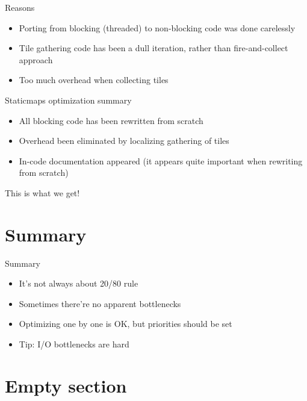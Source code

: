 \documentclass[16pt]{beamer}
\begin{document}
\begin{frame}{Reasons}
  \begin{itemize}
  \item Porting from blocking (threaded) to non-blocking code was done carelessly
  \item Tile gathering code has been a dull iteration, rather than fire-and-collect approach
  \item Too much overhead when collecting tiles
  \end{itemize}
\end{frame}

\begin{frame}{Staticmaps optimization summary}
  \begin{itemize}
  \item All blocking code has been rewritten from scratch
  \item Overhead been eliminated by localizing gathering of tiles
  \item In-code documentation appeared (it appears quite important when rewriting from scratch)
  \end{itemize}
\end{frame}

\begin{frame}[fragile]{This is what we get!}
  \begin{center}
  \end{center}
\end{frame}

\section*{Summary}

\begin{frame}{Summary}
  \begin{itemize}
  \item It's not always about 20/80 rule
  \item Sometimes there're no apparent bottlenecks
  \item Optimizing one by one is OK, but priorities should be set
  \item Tip: I/O bottlenecks are hard
  \end{itemize}
\end{frame}

\section{Empty section}
\end{document}
